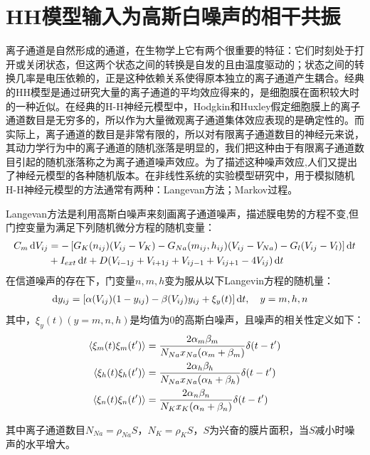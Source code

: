 \documentclass[
pdflinks,
]{xjtuthesis}
\begin{document}
\section{HH模型输入为高斯白噪声的相干共振}

离子通道是自然形成的通道，在生物学上它有两个很重要的特征：它们时刻处于打开或关闭状态，但这两个状态之间的转换是自发的且由温度驱动的；状态之间的转换几率是电压依赖的，正是这种依赖关系使得原本独立的离子通道产生耦合。经典的HH模型是通过研究大量的离子通道的平均效应得来的，是细胞膜在面积较大时的一种近似。在经典的H-H神经元模型中，Hodgkin和Huxley假定细胞膜上的离子通道数目是无穷多的，所以作为大量微观离子通道集体效应表现的是确定性的。而实际上，离子通道的数目是非常有限的，所以对有限离子通道数目的神经元来说，其动力学行为中的离子通道的随机涨落是明显的，我们把这种由于有限离子通道数目引起的随机涨落称之为离子通道噪声效应。为了描述这种噪声效应,人们又提出了神经元模型的各种随机版本。在非线性系统的实验模型研究中，用于模拟随机H-H神经元模型的方法通常有两种：Langevan方法；Markov过程。

\medskip

Langevan方法是利用高斯白噪声来刻画离子通道噪声，描述膜电势的方程不变,但门控变量为满足下列随机微分方程的随机变量：
\begin{align}
\notag C_m \,\mathrm d V_{ij} &= -\left[G_{K} (n_{ij})(V_{ij}-V_{K}) - G_{Na}(m_{ij},h_{ij})(V_{ij}-V_{Na}) - G_{l} (V_{ij}-V_{l})\right] \mathrm d t \\
&+ I_{ext} \,\mathrm d t + D(V_{i-1j}+V_{i+1j}+V_{ij-1}+V_{ij+1}-4V_{ij}) \,\mathrm d t
\end{align}
在信道噪声的存在下，门变量$n,m,h$变为服从以下Langevin方程的随机量：
\begin{align}
\mathrm d y_{ij} &= \left[\alpha (V_{ij})(1-y_{ij})-\beta (V_{ij})y_{ij} + \xi_y(t) \right] \mathrm d t, \quad y=m,h,n
\end{align}
其中，$\xi_y(t)(y=m,n,h)$是均值为0的高斯白噪声，且噪声的相关性定义如下：
\begin{align}
\notag \left \langle \xi_m(t)\xi_m(t') \right \rangle &= \dfrac{2\alpha_m \beta_m}{N_{Na}x_{Na}(\alpha_m+ \beta_m)} \delta(t-t') \\
\left \langle \xi_h(t)\xi_h(t') \right \rangle &=\dfrac{2\alpha_h \beta_h}{N_{Na}x_{Na}(\alpha_h+ \beta_h)} \delta(t-t') \\
\notag \left \langle \xi_n(t)\xi_n(t') \right \rangle &= \dfrac{2\alpha_n \beta_n}{N_{K}x_{K}(\alpha_n+ \beta_n)} \delta(t-t')
\end{align}

其中离子通道数目$N_{Na}=\rho_{Na}S$，$N_{K}=\rho_{K}S$，$S$为兴奋的膜片面积，当$S$减小时噪声的水平增大。
\end{document}
